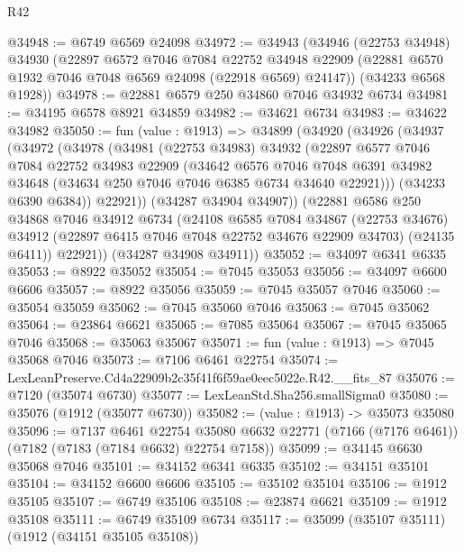 \begin{lexlean}{R42}
\begin{coremodule}
{@34948 := @6749 @6569 @24098
@34972 := @34943
    (@34946
      (@22753 @34948)
      @34930
      (@22897
        @6572
        @7046
        @7084
        @22752
        @34948
        @22909
        (@22881 @6570 @1932 @7046 @7048 @6569 @24098 (@22918 @6569) @24147))
      (@34233 @6568 @1928))
@34978 := @22881 @6579 @250 @34860 @7046 @34932 @6734
@34981 := @34195 @6578 @8921 @34859
@34982 := @34621 @6734
@34983 := @34622 @34982
@35050 := fun (value : @1913) =>
  @34899
    (@34920
      (@34926
        (@34937
          (@34972
            (@34978
              (@34981
                (@22753 @34983)
                @34932
                (@22897
                  @6577
                  @7046
                  @7084
                  @22752
                  @34983
                  @22909
                  (@34642
                    @6576
                    @7046
                    @7048
                    @6391
                    @34982
                    @34648
                    (@34634 @250 @7046 @7046 @6385 @6734 @34640 @22921)))
                (@34233 @6390 @6384))
              @22921))
          (@34287 @34904 @34907))
        (@22881
          @6586
          @250
          @34868
          @7046
          @34912
          @6734
          (@24108
            @6585
            @7084
            @34867
            (@22753 @34676)
            @34912
            (@22897 @6415 @7046 @7048 @22752 @34676 @22909 @34703)
            (@24135 @6411))
          @22921))
      (@34287 @34908 @34911))
@35052 := @34097 @6341 @6335
@35053 := @8922 @35052
@35054 := @7045 @35053
@35056 := @34097 @6600 @6606
@35057 := @8922 @35056
@35059 := @7045 @35057 @7046
@35060 := @35054 @35059
@35062 := @7045 @35060 @7046
@35063 := @7045 @35062
@35064 := @23864 @6621
@35065 := @7085 @35064
@35067 := @7045 @35065 @7046
@35068 := @35063 @35067
@35071 := fun (value : @1913) => @7045 @35068 @7046
@35073 := @7106 @6461 @22754
@35074 := LexLeanPreserve.Cd4a22909b2c35f41f6f59ae0eec5022e.R42.__fits_87
@35076 := @7120 (@35074 @6730)
@35077 := LexLeanStd.Sha256.smallSigma0
@35080 := @35076 (@1912 (@35077 @6730))
@35082 := (value : @1913) -> @35073 @35080
@35096 := @7137
    @6461
    @22754
    @35080
    @6632
    @22771
    (@7166 (@7176 @6461))
    (@7182 (@7183 (@7184 @6632) @22754 @7158))
@35099 := @34145 @6630 @35068 @7046
@35101 := @34152 @6341 @6335
@35102 := @34151 @35101
@35104 := @34152 @6600 @6606
@35105 := @35102 @35104
@35106 := @1912 @35105
@35107 := @6749 @35106
@35108 := @23874 @6621
@35109 := @1912 @35108
@35111 := @6749 @35109 @6734
@35117 := @35099 (@35107 @35111) (@1912 (@34151 @35105 @35108))
}
\end{coremodule}
\end{lexlean}
